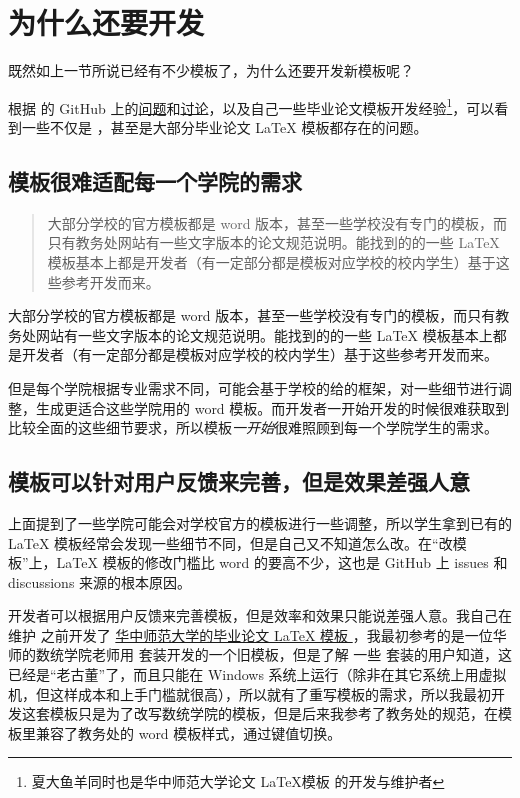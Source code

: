 \section{为什么还要开发 }

既然如上一节所说已经有不少模板了，为什么还要开发新模板呢？

根据  的 GitHub 上的\href{https://github.com/whutug/whu-thesis/issues}{问题}和\href{https://github.com/whutug/whu-thesis/discussions}{讨论}，以及自己一些毕业论文模板开发经验\footnote{夏大鱼羊同时也是华中师范大学论文 \LaTeX 模板 \href{https://github.com/xkwxdyy/CCNUthesis}{} 的开发与维护者}，可以看到一些不仅是 ，甚至是大部分毕业论文 \LaTeX{} 模板都存在的问题。


\subsection{模板很难适配每一个学院的需求}


\begin{quotation}
  大部分学校的官方模板都是 word 版本，甚至一些学校没有专门的模板，而只有教务处网站有一些文字版本的论文规范说明。能找到的的一些 \LaTeX{} 模板基本上都是开发者（有一定部分都是模板对应学校的校内学生）基于这些参考开发而来。
\end{quotation}

大部分学校的官方模板都是 word 版本，甚至一些学校没有专门的模板，而只有教务处网站有一些文字版本的论文规范说明。能找到的的一些 \LaTeX{} 模板基本上都是开发者（有一定部分都是模板对应学校的校内学生）基于这些参考开发而来。
  
但是每个学院根据专业需求不同，可能会基于学校的给的框架，对一些细节进行调整，生成更适合这些学院用的 word 模板。而开发者一开始开发的时候很难获取到比较全面的这些细节要求，所以模板\emph{一开始}很难照顾到每一个学院学生的需求。


\subsection{模板可以针对用户反馈来完善，但是效果差强人意}

上面提到了一些学院可能会对学校官方的模板进行一些调整，所以学生拿到已有的 \LaTeX{} 模板经常会发现一些细节不同，但是自己又不知道怎么改。在“改模板”上，\LaTeX{} 模板的修改门槛比 word 的要高不少，这也是 GitHub 上 issues 和 discussions 来源的根本原因。

开发者可以根据用户反馈来完善模板，但是效率和效果只能说差强人意。我自己在维护  之前开发了 \href{https://github.com/xkwxdyy/CCNUthesis}{华中师范大学的毕业论文 \LaTeX{} 模板 }，我最初参考的是一位华师的数统学院老师用 \CTeX 套装开发的一个旧模板，但是了解 一些 \CTeX 套装的用户知道，这已经是“老古董”了，而且只能在 Windows 系统上运行（除非在其它系统上用虚拟机，但这样成本和上手门槛就很高），所以就有了重写模板的需求，所以我最初开发这套模板只是为了改写数统学院的模板，但是后来我参考了教务处的规范，在模板里兼容了教务处的 word 模板样式，通过键值切换。

